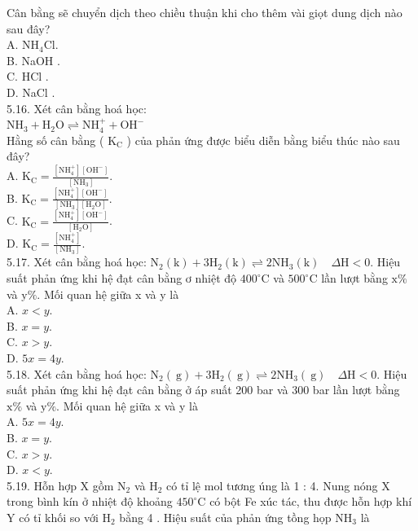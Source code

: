 \documentclass[10pt]{article}
\begin{document}
Cân bằng sẽ chuyển dịch theo chiều thuận khi cho thêm vài giọt dung dịch nào sau đây?\\
A. $\mathrm{NH}_{4} \mathrm{Cl}$.\\
B. NaOH .\\
C. HCl .\\
D. NaCl .\\
5.16. Xét cân bằng hoá học:\\
$\mathrm{NH}_{3}+\mathrm{H}_{2} \mathrm{O} \rightleftharpoons \mathrm{NH}_{4}^{+}+\mathrm{OH}^{-}$\\
Hằng số cân bằng ( $\mathrm{K}_{\mathrm{C}}$ ) của phản ứng được biểu diễn bằng biểu thúc nào sau đây?\\
A. $\mathrm{K}_{\mathrm{C}}=\frac{\left[\mathrm{NH}_{4}^{+}\right]\left[\mathrm{OH}^{-}\right]}{\left[\mathrm{NH}_{3}\right]}$.\\
B. $\mathrm{K}_{\mathrm{C}}=\frac{\left[\mathrm{NH}_{4}^{+}\right]\left[\mathrm{OH}^{-}\right]}{\left[\mathrm{NH}_{3}\right]\left[\mathrm{H}_{2} \mathrm{O}\right]}$.\\
C. $\mathrm{K}_{\mathrm{C}}=\frac{\left[\mathrm{NH}_{4}^{+}\right]\left[\mathrm{OH}^{-}\right]}{\left[\mathrm{H}_{2} \mathrm{O}\right]}$.\\
D. $\mathrm{K}_{\mathrm{C}}=\frac{\left[\mathrm{NH}_{4}^{+}\right]}{\left[\mathrm{NH}_{3}\right]}$.\\
5.17. Xét cân bằng hoá học: $\mathrm{N}_{2}(\mathrm{k})+3 \mathrm{H}_{2}(\mathrm{k}) \rightleftharpoons 2 \mathrm{NH}_{3}(\mathrm{k}) \quad \Delta \mathrm{H}<0$. Hiệu suất phản ứng khi hệ đạt cân bằng ơ nhiệt độ $400^{\circ} \mathrm{C}$ và $500^{\circ} \mathrm{C}$ lần lượt bằng $\mathrm{x} \%$ và $\mathrm{y} \%$. Mối quan hệ giữa x và y là\\
A. $x<y$.\\
B. $x=y$.\\
C. $x>y$.\\
D. $5 x=4 y$.\\
5.18. Xét cân bằng hoá học: $\mathrm{N}_{2}(\mathrm{~g})+3 \mathrm{H}_{2}(\mathrm{~g}) \rightleftharpoons 2 \mathrm{NH}_{3}(\mathrm{~g}) \quad \Delta \mathrm{H}<0$. Hiệu suất phản ứng khi hệ đạt cân bằng ở áp suất 200 bar và 300 bar lần lượt bằng $\mathrm{x} \%$ và $\mathrm{y} \%$. Mối quan hệ giữa x và y là\\
A. $5 x=4 y$.\\
B. $x=y$.\\
C. $x>y$.\\
D. $x<y$.\\
5.19. Hỗn hợp X gồm $\mathrm{N}_{2}$ và $\mathrm{H}_{2}$ có tỉ lệ mol tương úng là 1 : 4. Nung nóng X trong bình kín ở nhiệt độ khoảng $450^{\circ} \mathrm{C}$ có bột Fe xúc tác, thu được hỗn hợp khí Y có tỉ khối so với $\mathrm{H}_{2}$ bằng 4 . Hiệu suất của phản ứng tồng họp $\mathrm{NH}_{3}$ là\\
\end{document}
